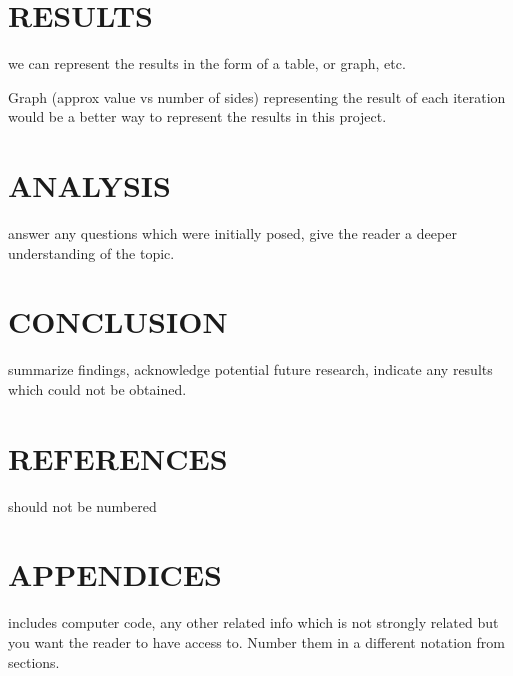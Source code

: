 \documentclass[12pt]{article}
\begin{document}
\section {RESULTS}
we can represent the results in the form of a table, or graph, etc.

Graph (approx value vs number of sides) representing the result of each iteration would be a better way to represent the results in this project.


\section {ANALYSIS}
answer any questions which were initially posed, give the reader a deeper understanding of the topic.


\section {CONCLUSION}
summarize findings, acknowledge potential future research, indicate any results which could not be obtained.


\section {REFERENCES}
should not be numbered

\section {APPENDICES}
includes computer code, any other related info which is not strongly related but you want the reader to have access to. Number them in a different notation from sections.
\end{document}

